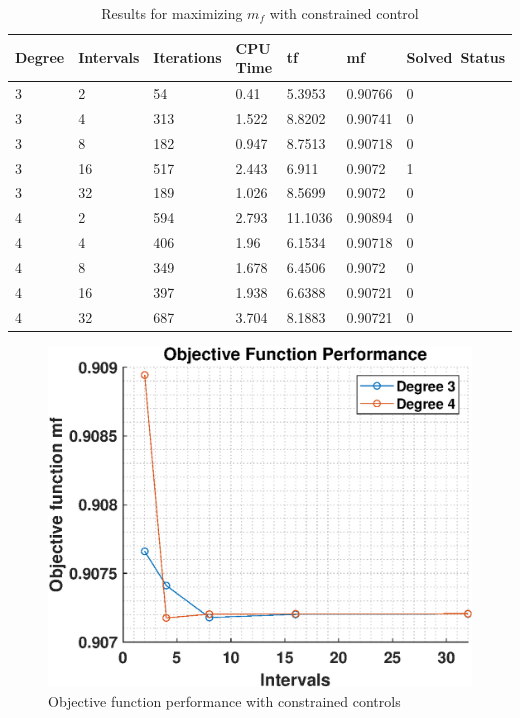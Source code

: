 \documentclass[]{article}
\begin{document}
	\begin{table}[h!]
		\begin{tabular}{lllllll}
			Degree & Intervals & Iterations & CPU Time & tf & mf & Solved\ Status \\ 
			\hline 
			3 & 2 & 54 & 0.41 & 5.3953 & 0.90766 & 0 \\ 
			3 & 4 & 313 & 1.522 & 8.8202 & 0.90741 & 0 \\ 
			3 & 8 & 182 & 0.947 & 8.7513 & 0.90718 & 0 \\ 
			3 & 16 & 517 & 2.443 & 6.911 & 0.9072 & 1 \\ 
			3 & 32 & 189 & 1.026 & 8.5699 & 0.9072 & 0 \\ 
			4 & 2 & 594 & 2.793 & 11.1036 & 0.90894 & 0 \\ 
			4 & 4 & 406 & 1.96 & 6.1534 & 0.90718 & 0 \\ 
			4 & 8 & 349 & 1.678 & 6.4506 & 0.9072 & 0 \\ 
			4 & 16 & 397 & 1.938 & 6.6388 & 0.90721 & 0 \\ 
			4 & 32 & 687 & 3.704 & 8.1883 & 0.90721 & 0 \\ 
			\hline 
		\end{tabular}
		\caption{Results for maximizing \(m_f\) with constrained control}
		\label{table:4}
	\end{table}
	\begin{figure}
		\centering
		\includegraphics[scale=0.75]{obj_c3_mf.eps}
		\caption{Objective function performance with constrained controls}
		\label{fig:obj_c3_mf}
	\end{figure}
\end{document}
